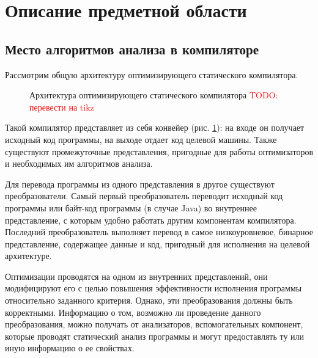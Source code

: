 \documentclass[14pt,titlepage]{extarticle}
\newcommand{\todo}[1]{\textcolor{red}{\eng{TODO}: #1}}
\newcommand{\eng}[1]{{\English#1}}
\let\oldsection\section
\renewcommand{\section}{\newpage\oldsection}
\begin{document}
  \section{Описание предметной области}

    \subsection{Место алгоритмов анализа в компиляторе}

      Рассмотрим общую архитектуру оптимизирующего статического компилятора.

      \begin{figure}[!htb]
        \caption{Архитектура оптимизирующего статического компилятора
                 \todo{перевести на tikz}}
        \label{fig:arch}
      \end{figure}

      Такой компилятор представляет из себя конвейер (рис. \ref{fig:arch}): на
      входе он получает исходный код программы, на выходе отдает код целевой
      машины.
      Также существуют промежуточные представления, пригодные для работы
      оптимизаторов и необходимых им алгоритмов анализа.

      Для перевода программы из одного представления в другое существуют
      преобразователи.
      Самый первый преобразователь переводит исходный код программы
      или байт-код программы (в случае Java)
      во внутреннее представление, с которым удобно работать другим
      компонентам компилятора.
      Последний преобразователь выполняет перевод в самое низкоуровневое,
      бинарное представление, содержащее данные и код, пригодный для исполнения
      на целевой архитектуре.

      Оптимизации проводятся на одном из внутренних представлений, они
      модифицируют его с целью повышения эффективности исполнения программы
      относительно заданного критерия. Однако, эти преобразования должны быть
      корректными. Информацию о том, возможно ли проведение данного
      преобразования, можно получать от анализаторов, вспомогательных
      компонент, которые проводят статический анализ программы и могут
      предоставлять ту или иную информацию о ее свойствах.
\end{document}
